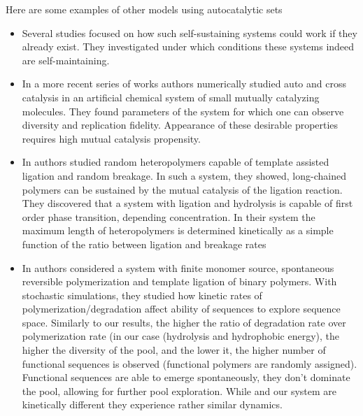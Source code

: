 \documentclass[journal=jacsat,manuscript=article,layout=twocolumn]{achemso}
\begin{document}
Here are some examples of other models using autocatalytic sets
\begin{itemize}
 \item Several studies\cite{Eigen1978,Dyson1985,Kauffman1986} focused on how such self-sustaining 
systems could work if they already exist. They investigated under which conditions these systems 
indeed are self-maintaining.

\item In a more recent series of works \cite{segre1998graded,Segre2000,Markovitch2012} 
 authors numerically studied auto and cross catalysis in an artificial chemical system of 
 small mutually catalyzing  molecules. They found parameters of the system for which one can 
observe 
diversity and replication fidelity.
 Appearance of these desirable properties requires high mutual catalysis propensity.

\item In \cite{Tkachenko2014} authors studied random heteropolymers capable of template 
assisted ligation and random breakage. In such a system, they showed,  long-chained
polymers  can be sustained by the mutual catalysis of the ligation reaction. They discovered
that a system with ligation and hydrolysis is capable of first order phase transition, depending 
concentration. 
In their system the maximum length of heteropolymers is determined kinetically as a simple function 
of the ratio
between ligation and breakage rates

\item In \cite{Walker2012} authors considered a system with finite monomer source, spontaneous 
reversible polymerization
and template ligation of binary polymers. With stochastic simulations, they studied how kinetic 
rates of polymerization/degradation
affect ability of sequences to explore sequence space. Similarly to our results, the higher the 
ratio of degradation rate
over polymerization rate (in our case (hydrolysis and hydrophobic energy), the higher the diversity 
of the pool, and the lower it, the higher number of functional sequences is observed (functional 
polymers are randomly assigned). Functional sequences are able to emerge spontaneously,
they don't dominate the pool, allowing for further pool exploration. While \cite{Walker2012} and our 
system are kinetically different they experience rather similar dynamics.
\end{itemize}
\end{document}
